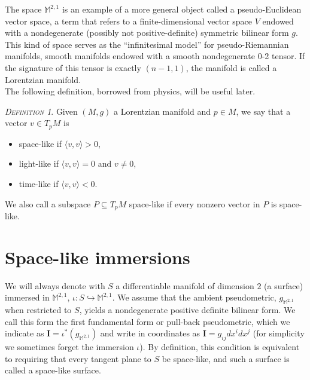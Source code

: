 \documentclass[a4paper,11pt,openright,twoside]{book}
\newcommand{\M}{\mathbb{M}^{2,1}}
\newcommand{\I}{\mathbf{I}}
\newcommand{\1}{\mathds{1}}
\theoremstyle{plain}
\theoremstyle{definition}
\theoremstyle{remark}
\newtheorem*{defn*}{\textsc{Definition}}
\begin{document}
The space $\M$ is an example of a more general object called a pseudo-Euclidean vector space, a term that refers to a finite-dimensional vector space $V$ endowed with a nondegenerate (possibly not positive-definite) symmetric bilinear form $g$. This kind of space serves as the ``infinitesimal model'' for pseudo-Riemannian manifolds, smooth manifolds endowed with a smooth nondegenerate 0-2 tensor. If the signature of this tensor is exactly $(n-1,1)$, the manifold is called a Lorentzian manifold.\\
The following definition, borrowed from physics, will be useful later.
\begin{defn*}
	Given $(M,g)$ a Lorentzian manifold and $p \in M$, we say that a vector $v \in T_pM$ is
	\begin{itemize}[noitemsep]
		\item {space-like} if $\langle v,v\rangle > 0$,
		\item {light-like} if $\langle v,v\rangle = 0$ and $v \neq 0$,
		\item {time-like} if $\langle v,v\rangle < 0$.
	\end{itemize}
	We also call a subspace $P \subseteq T_pM$ space-like if every nonzero vector in $P$ is space-like.
\end{defn*}
\section{Space-like immersions}%
We will always denote with $S$ a differentiable manifold of dimension  $2$  (a surface) immersed in $\M$, $\iota:S\hookrightarrow \M$. We assume that the ambient pseudometric, $g_{\M}$ when restricted to $S$, yields a nondegenerate positive definite bilinear form. We call this form the first fundamental form or pull-back pseudometric, which we indicate as $\I = \iota^*(g_{\M}) $ and write in coordinates as $\I = g_{ij}dx^i dx^j$ (for simplicity we sometimes forget the immersion $\iota$). By definition, this condition is equivalent to requiring that every tangent plane to $S$ be space-like, and such a surface is called a space-like surface.\\
\end{document}
